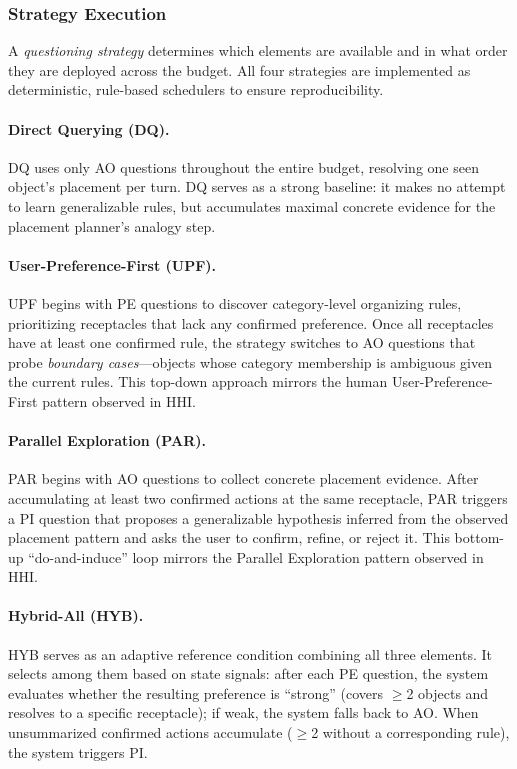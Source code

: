 \documentclass[manuscript,review,anonymous]{acmart}
\begin{document}
{\subsubsection{Strategy Execution}
\label{sec:strategies}

A \textit{questioning strategy} determines which elements are available and in what order they are deployed across the budget. All four strategies are implemented as deterministic, rule-based schedulers to ensure reproducibility.

\paragraph{Direct Querying (DQ).} DQ uses only AO questions throughout the entire budget, resolving one seen object's placement per turn. DQ serves as a strong baseline: it makes no attempt to learn generalizable rules, but accumulates maximal concrete evidence for the placement planner's analogy step.

\paragraph{User-Preference-First (UPF).} UPF begins with PE questions to discover category-level organizing rules, prioritizing receptacles that lack any confirmed preference. Once all receptacles have at least one confirmed rule, the strategy switches to AO questions that probe \textit{boundary cases}---objects whose category membership is ambiguous given the current rules. This top-down approach mirrors the human User-Preference-First pattern observed in HHI.

\paragraph{Parallel Exploration (PAR).} PAR begins with AO questions to collect concrete placement evidence. After accumulating at least two confirmed actions at the same receptacle, PAR triggers a PI question that proposes a generalizable hypothesis inferred from the observed placement pattern and asks the user to confirm, refine, or reject it. This bottom-up ``do-and-induce'' loop mirrors the Parallel Exploration pattern observed in HHI.

\paragraph{Hybrid-All (HYB).} HYB serves as an adaptive reference condition combining all three elements. It selects among them based on state signals: after each PE question, the system evaluates whether the resulting preference is ``strong'' (covers $\geq$2 objects and resolves to a specific receptacle); if weak, the system falls back to AO. When unsummarized confirmed actions accumulate ($\geq$2 without a corresponding rule), the system triggers PI.

}
\end{document}
